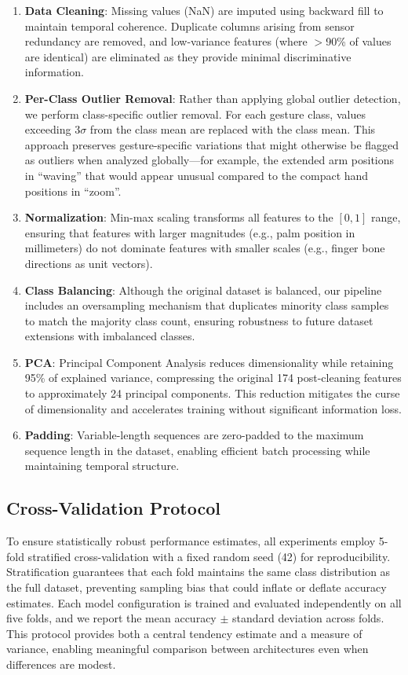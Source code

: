 \documentclass[conference]{IEEEtran}
\begin{document}
\begin{enumerate}
    \item \textbf{Data Cleaning}: Missing values (NaN) are imputed using backward fill to maintain temporal coherence. Duplicate columns arising from sensor redundancy are removed, and low-variance features (where $>$90\% of values are identical) are eliminated as they provide minimal discriminative information.
    
    \item \textbf{Per-Class Outlier Removal}: Rather than applying global outlier detection, we perform class-specific outlier removal. For each gesture class, values exceeding 3$\sigma$ from the class mean are replaced with the class mean. This approach preserves gesture-specific variations that might otherwise be flagged as outliers when analyzed globally---for example, the extended arm positions in ``waving'' that would appear unusual compared to the compact hand positions in ``zoom''.
    
    \item \textbf{Normalization}: Min-max scaling transforms all features to the $[0, 1]$ range, ensuring that features with larger magnitudes (e.g., palm position in millimeters) do not dominate features with smaller scales (e.g., finger bone directions as unit vectors).
    
    \item \textbf{Class Balancing}: Although the original dataset is balanced, our pipeline includes an oversampling mechanism that duplicates minority class samples to match the majority class count, ensuring robustness to future dataset extensions with imbalanced classes.
    
    \item \textbf{PCA}: Principal Component Analysis reduces dimensionality while retaining 95\% of explained variance, compressing the original 174 post-cleaning features to approximately 24 principal components. This reduction mitigates the curse of dimensionality and accelerates training without significant information loss.
    
    \item \textbf{Padding}: Variable-length sequences are zero-padded to the maximum sequence length in the dataset, enabling efficient batch processing while maintaining temporal structure.
\end{enumerate}

\subsection{Cross-Validation Protocol}
To ensure statistically robust performance estimates, all experiments employ 5-fold stratified cross-validation with a fixed random seed (42) for reproducibility. Stratification guarantees that each fold maintains the same class distribution as the full dataset, preventing sampling bias that could inflate or deflate accuracy estimates. Each model configuration is trained and evaluated independently on all five folds, and we report the mean accuracy $\pm$ standard deviation across folds. This protocol provides both a central tendency estimate and a measure of variance, enabling meaningful comparison between architectures even when differences are modest.
\end{document}

